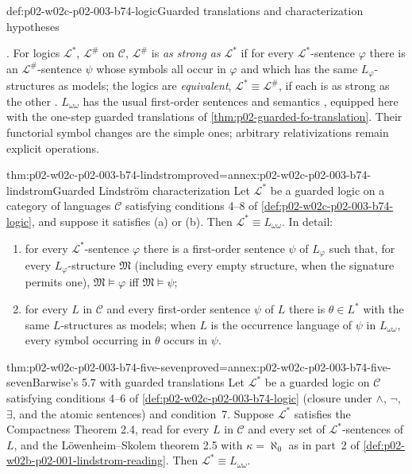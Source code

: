 \begin{hbdefinition}{def:p02-w02c-p02-003-b74-logic}{Guarded translations and characterization hypotheses}
\begin{enumerate}
\end{enumerate}
\cite[Part~II, \S3, 3.4, p.~259]{Barwise1974Axioms}.  For logics
\(\mathcal L^{\ast}\), \(\mathcal L^{\#}\) on \(\mathcal C\),
\(\mathcal L^{\#}\) is \emph{as strong as} \(\mathcal L^{\ast}\) if for
every \(\mathcal L^{\ast}\)-sentence \(\varphi\) there is an
\(\mathcal L^{\#}\)-sentence \(\psi\) whose symbols all occur in \(\varphi\)
and which has the same \(L_\varphi\)-structures as models; the logics are
\emph{equivalent}, \(\mathcal L^{\ast}\equiv\mathcal L^{\#}\), if each is as
strong as the other \cite[Part~II, \S3, 3.1, p.~257]{Barwise1974Axioms}.
\(L_{\omega\omega}\) has the usual first-order sentences and semantics
\cite[Part~I, \S1, p.~222]{Barwise1974Axioms}, equipped here with the
one-step guarded translations of \cref{thm:p02-guarded-fo-translation}.
Their functorial symbol changes are the simple ones; arbitrary
relativizations remain explicit operations.
\end{hbdefinition}

\begin{hbtheorem}{thm:p02-w02c-p02-003-b74-lindstrom}{proved=annex:p02-w02c-p02-003-b74-lindstrom}{Guarded Lindstr\"om characterization}
Let \(\mathcal L^{\ast}\) be a guarded logic on a category of languages
\(\mathcal C\) satisfying conditions 4--8 of
\cref{def:p02-w02c-p02-003-b74-logic}, and suppose it satisfies (a) or
(b).  Then \(\mathcal L^{\ast}\equiv L_{\omega\omega}\).  In detail:
\begin{enumerate}
\item for every \(\mathcal L^{\ast}\)-sentence \(\varphi\) there is a
      first-order sentence \(\psi\) of \(L_\varphi\) such that, for every
      \(L_\varphi\)-structure \(\mathfrak M\) (including every empty structure, when
      the signature permits one), \(\mathfrak M\models\varphi\) iff \(\mathfrak M\models\psi\);
\item for every \(L\) in \(\mathcal C\) and every first-order sentence
      \(\psi\) of \(L\) there is \(\theta\in L^{\ast}\) with the same
      \(L\)-structures as models; when \(L\) is the occurrence language of
      \(\psi\) in \(L_{\omega\omega}\), every symbol occurring in \(\theta\)
      occurs in \(\psi\).
\end{enumerate}
\end{hbtheorem}

\begin{hbcorollary}{thm:p02-w02c-p02-003-b74-five-seven}{proved=annex:p02-w02c-p02-003-b74-five-seven}{Barwise's 5.7 with guarded translations}
Let \(\mathcal L^{\ast}\) be a guarded logic on \(\mathcal C\) satisfying conditions
4--6 of \cref{def:p02-w02c-p02-003-b74-logic} (closure under \(\land\),
\(\neg\), \(\exists\), and the atomic sentences) and condition~7.  Suppose
\(\mathcal L^{\ast}\) satisfies the Compactness Theorem 2.4, read for every
\(L\) in \(\mathcal C\) and every set of \(\mathcal L^{\ast}\)-sentences of
\(L\), and the L\"owenheim--Skolem theorem 2.5 with \(\kappa=\aleph_0\) as
in part~2 of \cref{def:p02-w02b-p02-001-lindstrom-reading}.  Then
\(\mathcal L^{\ast}\equiv L_{\omega\omega}\).
\end{hbcorollary}


